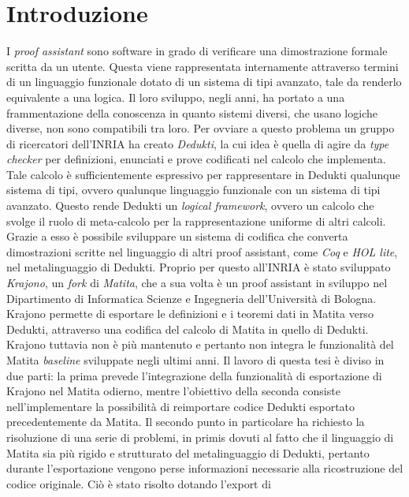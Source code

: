 \documentclass[12pt,a4paper]{mimosis}
\begin{document}
\thispagestyle{empty}
\tableofcontents

\chapter{Introduzione}
I \textit{proof assistant} sono software in grado di verificare una dimostrazione
formale scritta da un utente. Questa viene rappresentata internamente attraverso 
termini di un linguaggio funzionale dotato di un sistema di tipi avanzato, tale
da renderlo equivalente a una logica. Il loro sviluppo, negli anni, ha portato a una 
frammentazione della conoscenza in quanto sistemi diversi, che usano logiche diverse,
non sono compatibili tra loro. Per ovviare a questo problema un gruppo di ricercatori
dell'INRIA ha creato \textit{Dedukti}, la cui idea è quella di agire da \textit{type
checker} per definizioni, enunciati e prove codificati nel calcolo che implementa. 
Tale calcolo è sufficientemente espressivo per rappresentare in Dedukti qualunque
sistema di tipi, ovvero qualunque linguaggio funzionale con un sistema di tipi avanzato.
Questo rende Dedukti un \textit{logical framework}, ovvero un calcolo che svolge il 
ruolo di meta-calcolo per la rappresentazione uniforme di altri calcoli. Grazie a
esso è possibile sviluppare un sistema di codifica che converta dimostrazioni scritte
nel linguaggio di altri proof assistant, come \textit{Coq} e \textit{HOL lite}, nel
metalinguaggio di Dedukti. Proprio per questo all'INRIA è stato sviluppato \textit{Krajono},
un \textit{fork} di \textit{Matita}, che a sua volta è un proof assistant in sviluppo
nel Dipartimento di Informatica Scienze e Ingegneria dell'Università di Bologna.
Krajono permette di esportare le definizioni e i teoremi dati in Matita verso Dedukti,
attraverso una codifica del calcolo di Matita in quello di Dedukti. Krajono tuttavia 
non è più mantenuto e pertanto non integra le funzionalità del Matita \textit{baseline}
sviluppate negli ultimi anni. Il lavoro di questa tesi è diviso in due parti: la prima
prevede l'integrazione della funzionalità di esportazione di Krajono nel Matita odierno,
mentre l'obiettivo della seconda consiste nell'implementare la possibilità di reimportare
codice Dedukti esportato precedentemente da Matita. Il secondo punto in particolare 
ha richiesto la risoluzione di una serie di problemi, in primis dovuti al fatto che
il linguaggio di Matita sia più rigido e strutturato del metalinguaggio di Dedukti,
pertanto durante l'esportazione vengono perse informazioni necessarie alla
ricostruzione del codice originale. Ciò è stato risolto dotando l'export di
\end{document}
